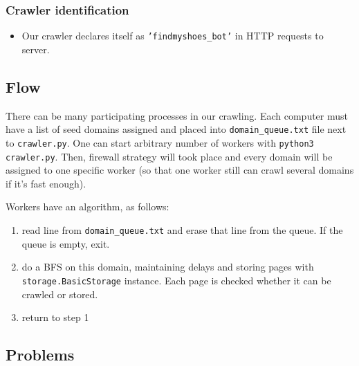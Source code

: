 \documentclass[format=sigconf]{acmart}
\begin{document}
\subsubsection{Crawler identification}
\begin{itemize}
    \item Our crawler declares itself as \texttt{'findmyshoes\_bot'} in HTTP requests to server.
\end{itemize}

\subsection{Flow}
    There can be many participating processes in our crawling. 
    Each computer must have a list of seed domains assigned and placed into \texttt{domain\_queue.txt} file next to \texttt{crawler.py}. One can start arbitrary number of workers with \texttt{python3 crawler.py}. Then, firewall strategy will took place and every domain will be assigned to one specific worker (so that one worker still can crawl several domains if it's fast enough).
    
    Workers have an algorithm, as follows:
    \begin{enumerate}
        \item read line from \texttt{domain\_queue.txt} and erase that line from the queue. If the queue is empty, exit.
        \item do a BFS on this domain, maintaining delays and storing pages with \texttt{storage.BasicStorage} instance. Each page is checked whether it can be crawled or stored.
        \item return to step 1
    \end{enumerate}

\subsection{Problems}
\end{document}
